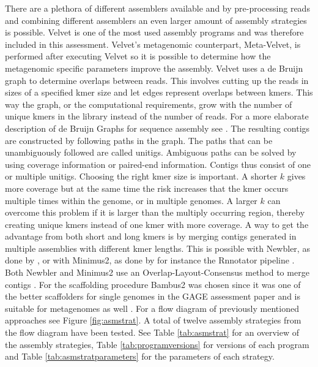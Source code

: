 \documentclass[a4paper,12pt]{article}
\begin{document}
There are a plethora of different assemblers available and by pre-processing
reads and combining different assemblers an even larger amount of assembly
strategies is possible. Velvet is one of the most used assembly programs and
was therefore included in this assessment. Velvet's metagenomic counterpart,
Meta-Velvet, is performed after executing Velvet so it is possible to
determine how the metagenomic specific parameters improve the assembly. Velvet
uses a de Bruijn graph to determine overlaps between reads. This involves
cutting up the reads in sizes of a specified kmer size and let edges represent
overlaps between kmers. This way the graph, or the computational requirements,
grow with the number of unique kmers in the library instead of the number of
reads. For a more elaborate description of de Bruijn Graphs for sequence
assembly see \cite{Miller20211242}. The resulting contigs are constructed by
following paths in the graph. The paths that can be unambiguously followed are
called unitigs. Ambiguous paths can be solved by using coverage information or
paired-end information. Contigs thus consist of one or multiple unitigs.
Choosing the right kmer size is important. A shorter $k$ gives more coverage
but at the same time the risk increases that the kmer occurs multiple times
within the genome, or in multiple genomes. A larger $k$ can overcome this
problem if it is larger than the multiply occurring region, thereby creating
unique kmers instead of one kmer with more coverage. A way to get the advantage
from both short and long kmers is by merging contigs generated in multiple
assemblies with different kmer lengths. This is possible with Newbler, as done
by \citet{Luo22347999}, or with Minimus2, as done by for instance the Rnnotator
pipeline \cite{Martin21106091}. Both Newbler and Minimus2 use an
Overlap-Layout-Consensus method to merge contigs
\cite{Sommer17324286,Miller20211242}. For the scaffolding procedure Bambus2 was
chosen since it was one of the better scaffolders for single genomes in the
GAGE assessment paper \cite{Salzberg22147368} and is suitable for metagenomes
as well \cite{Koren21926123}. For a flow diagram of previously mentioned
approaches see Figure \ref{fig:asmstrat}. A total of twelve assembly strategies
from the flow diagram have been tested. See Table \ref{tab:asmstrat} for an
overview of the assembly strategies, Table \ref{tab:programversions} for
versions of each program and Table \ref{tab:asmstratparameters} for the
parameters of each strategy.
\end{document}
